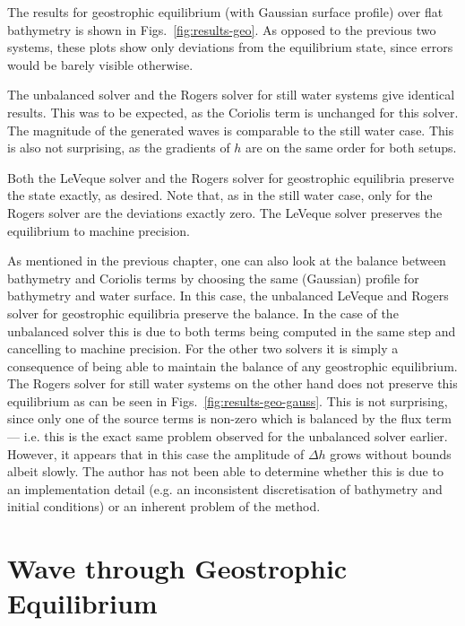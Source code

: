 The results for geostrophic equilibrium (with Gaussian surface profile) over flat bathymetry is shown in Figs.~\ref{fig:results-geo}. As opposed to the previous two systems, these plots show only deviations from the equilibrium state, since errors would be barely visible otherwise.

The unbalanced solver and the Rogers solver for still water systems give identical results. This was to be expected, as the Coriolis term is unchanged for this solver. The magnitude of the generated waves is comparable to the still water case. This is also not surprising, as the gradients of $h$ are on the same order for both setups.

Both the LeVeque solver and the Rogers solver for geostrophic equilibria preserve the state exactly, as desired. Note that, as in the still water case, only for the Rogers solver are the deviations exactly zero. The LeVeque solver preserves the equilibrium to machine precision.

As mentioned in the previous chapter, one can also look at the balance between bathymetry and Coriolis terms by choosing the same (Gaussian) profile for bathymetry and water surface. In this case, the unbalanced LeVeque and Rogers solver for geostrophic equilibria preserve the balance. In the case of the unbalanced solver this is due to both terms being computed in the same step and cancelling to machine precision. For the other two solvers it is simply a consequence of being able to maintain the balance of any geostrophic equilibrium. The Rogers solver for still water systems on the other hand does not preserve this equilibrium as can be seen in Figs.~\ref{fig:results-geo-gauss}. This is not surprising, since only one of the source terms is non-zero which is balanced by the flux term --- i.e. this is the exact same problem observed for the unbalanced solver earlier. However, it appears that in this case the amplitude of $\Delta h$ grows without bounds albeit slowly. The author has not been able to determine whether this is due to an implementation detail (e.g. an inconsistent discretisation of bathymetry and initial conditions) or an inherent problem of the method.

\section{Wave through Geostrophic Equilibrium}

